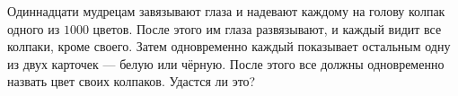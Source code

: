 Одиннадцати мудрецам завязывают глаза и надевают каждому на голову колпак одного из $1000$ цветов. После этого им глаза развязывают, и каждый видит все колпаки, кроме своего. Затем одновременно каждый показывает остальным одну из двух карточек --- белую или чёрную. После  этого все должны одновременно назвать цвет своих колпаков. Удастся ли это?
